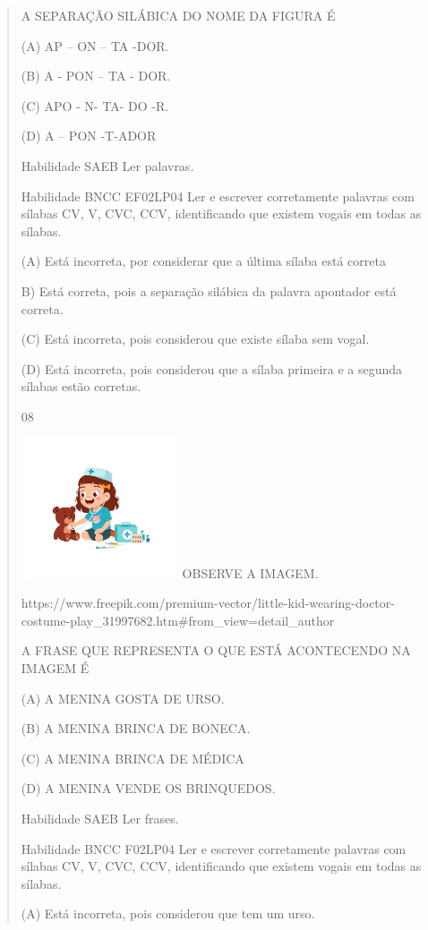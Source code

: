 \begin{verse}
{{{{{{{{{{{{{{{{{{{{A SEPARAÇÃO SILÁBICA DO NOME DA FIGURA É

(A) AP -- ON -- TA -DOR.

(B) A - PON -- TA - DOR.

(C) APO - N- TA- DO -R.

(D) A -- PON -T-ADOR

Habilidade SAEB Ler palavras.

Habilidade BNCC EF02LP04 Ler e escrever corretamente palavras com
sílabas CV, V, CVC, CCV, identificando que existem vogais em todas as
sílabas.

(A) \protect\hypertarget{_Hlk129375975}{}{}Está incorreta, por
considerar que a última sílaba está correta

B) Está correta, pois a separação silábica da palavra apontador está
correta.

(C) Está incorreta, pois considerou que existe sílaba sem vogal.

(D) Está incorreta, pois considerou que a sílaba primeira e a segunda
sílabas estão corretas.

\num{08}

\includegraphics[width=1.87273in,height=1.62645in]{media/image169.jpeg}OBSERVE
A IMAGEM.

https://www.freepik.com/premium-vector/little-kid-wearing-doctor-costume-play\_31997682.htm\#from\_view=detail\_author

A FRASE QUE REPRESENTA O QUE ESTÁ ACONTECENDO NA IMAGEM É

(A) A MENINA GOSTA DE URSO.

(B) A MENINA BRINCA DE BONECA.

(C) A MENINA BRINCA DE MÉDICA

(D) A MENINA VENDE OS BRINQUEDOS.

Habilidade SAEB Ler frases.

Habilidade BNCC F02LP04 Ler e escrever corretamente palavras com sílabas
CV, V, CVC, CCV, identificando que existem vogais em todas as sílabas.

(A) Está incorreta, pois considerou que tem um urso.

}}}}}}}}}}}}}}}}}}}}
\end{verse}
